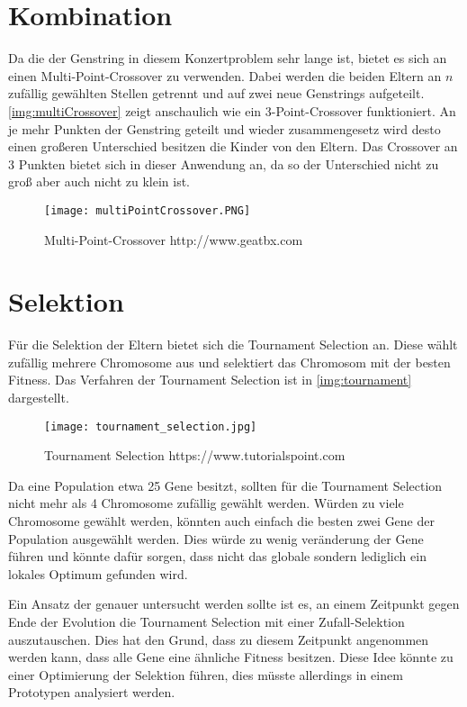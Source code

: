 \section{Kombination}\label{sec:eltern}
Da die der Genstring in diesem Konzertproblem sehr lange ist, bietet es sich an einen Multi-Point-Crossover zu verwenden.
Dabei werden die beiden Eltern an $n$ zufällig gewählten Stellen getrennt und auf zwei neue Genstrings aufgeteilt.
\autoref{img:multiCrossover} zeigt anschaulich wie ein 3-Point-Crossover funktioniert. An je mehr Punkten
der Genstring geteilt und wieder zusammengesetz wird desto einen großeren Unterschied besitzen die Kinder von
den Eltern. Das Crossover an 3 Punkten bietet sich in dieser Anwendung an, da so der Unterschied nicht zu groß aber auch nicht zu klein ist.

\begin{figure}[h]
    \begin{minipage}{\textwidth}
	    \centering
        \texttt{[image: multiPointCrossover.PNG]}
	    \caption{Multi-Point-Crossover {http://www.geatbx.com}}
        \label{img:multiCrossover}
    \end{minipage}
\end{figure}

\section{Selektion}
Für die Selektion der Eltern bietet sich die Tournament Selection an.
Diese wählt zufällig mehrere Chromosome aus und selektiert das Chromosom mit der besten Fitness. Das Verfahren der
Tournament Selection ist in \autoref{img:tournament} dargestellt.


\begin{figure}
    \begin{minipage}{\textwidth}
        \texttt{[image: tournament\_selection.jpg]}
        \caption{Tournament Selection {https://www.tutorialspoint.com}}
        \label{img:tournament}
    \end{minipage}
\end{figure}

Da eine Population etwa 25 Gene besitzt, sollten für die Tournament Selection nicht mehr als 4 Chromosome zufällig gewählt werden.
Würden zu viele Chromosome gewählt werden, könnten auch einfach die besten zwei Gene der Population ausgewählt werden.
Dies würde zu wenig veränderung der Gene führen und könnte dafür sorgen, dass nicht das globale sondern
lediglich ein lokales Optimum gefunden wird.

Ein Ansatz der genauer untersucht werden sollte ist es, an einem Zeitpunkt gegen Ende der
Evolution die Tournament Selection mit einer Zufall-Selektion auszutauschen.
Dies hat den Grund, dass zu diesem Zeitpunkt angenommen werden kann, dass alle
Gene eine ähnliche Fitness besitzen. Diese Idee könnte zu einer Optimierung der Selektion führen, dies 
müsste allerdings in einem Prototypen analysiert werden. 